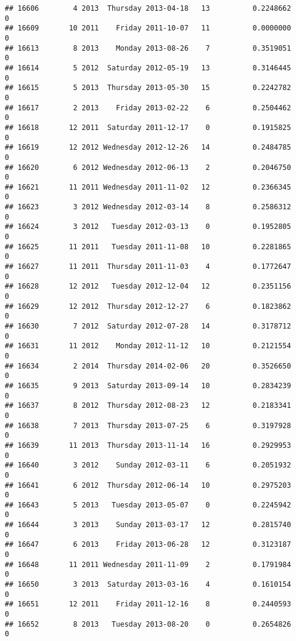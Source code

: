 \documentclass[
]{article}
\begin{document}
\begin{verbatim}
## 16606        4 2013  Thursday 2013-04-18   13          0.2248662             0
## 16609       10 2011    Friday 2011-10-07   11          0.0000000             0
## 16613        8 2013    Monday 2013-08-26    7          0.3519051             0
## 16614        5 2012  Saturday 2012-05-19   13          0.3146445             0
## 16615        5 2013  Thursday 2013-05-30   15          0.2242782             0
## 16617        2 2013    Friday 2013-02-22    6          0.2504462             0
## 16618       12 2011  Saturday 2011-12-17    0          0.1915825             0
## 16619       12 2012 Wednesday 2012-12-26   14          0.2484785             0
## 16620        6 2012 Wednesday 2012-06-13    2          0.2046750             0
## 16621       11 2011 Wednesday 2011-11-02   12          0.2366345             0
## 16623        3 2012 Wednesday 2012-03-14    8          0.2586312             0
## 16624        3 2012   Tuesday 2012-03-13    0          0.1952805             0
## 16625       11 2011   Tuesday 2011-11-08   10          0.2281865             0
## 16627       11 2011  Thursday 2011-11-03    4          0.1772647             0
## 16628       12 2012   Tuesday 2012-12-04   12          0.2351156             0
## 16629       12 2012  Thursday 2012-12-27    6          0.1823862             0
## 16630        7 2012  Saturday 2012-07-28   14          0.3178712             0
## 16631       11 2012    Monday 2012-11-12   10          0.2121554             0
## 16634        2 2014  Thursday 2014-02-06   20          0.3526650             0
## 16635        9 2013  Saturday 2013-09-14   10          0.2834239             0
## 16637        8 2012  Thursday 2012-08-23   12          0.2183341             0
## 16638        7 2013  Thursday 2013-07-25    6          0.3197928             0
## 16639       11 2013  Thursday 2013-11-14   16          0.2929953             0
## 16640        3 2012    Sunday 2012-03-11    6          0.2051932             0
## 16641        6 2012  Thursday 2012-06-14   10          0.2975203             0
## 16643        5 2013   Tuesday 2013-05-07    0          0.2245942             0
## 16644        3 2013    Sunday 2013-03-17   12          0.2815740             0
## 16647        6 2013    Friday 2013-06-28   12          0.3123187             0
## 16648       11 2011 Wednesday 2011-11-09    2          0.1791984             0
## 16650        3 2013  Saturday 2013-03-16    4          0.1610154             0
## 16651       12 2011    Friday 2011-12-16    8          0.2440593             0
## 16652        8 2013   Tuesday 2013-08-20    0          0.2654826             0

\end{verbatim}
\end{document}
